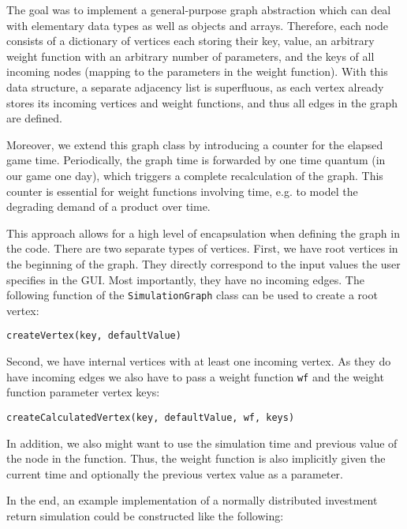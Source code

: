  
The goal was to implement a general-purpose graph abstraction which can deal with elementary data types as well as objects and arrays.
Therefore, each node consists of a dictionary of vertices each storing their key, value, an arbitrary weight function with an arbitrary number of parameters, and the keys of all incoming nodes (mapping to the parameters in the weight function). With this data structure, a separate adjacency list is superfluous, as each vertex already stores its incoming vertices and weight functions, and thus all edges in the graph are defined.


Moreover, we extend this graph class by introducing a counter for the elapsed game time. Periodically, the graph time is forwarded by one time quantum (in our game one day), which triggers a complete recalculation of the graph. This counter is essential for weight functions involving time, e.g. to model the degrading demand of a product over time.

This approach allows for a high level of encapsulation when defining the graph in the code. There are two separate types of vertices. First, we have root vertices in the beginning of the graph. They directly correspond to the input values the user specifies in the GUI. Most importantly, they have no incoming edges. The following function of the \texttt{SimulationGraph} class can be used to create a root vertex:

\begin{center}
	\texttt{createVertex(key, defaultValue)}
\end{center}

Second, we have internal vertices with at least one incoming vertex. As they do have incoming edges we also have to pass a weight function \texttt{wf} and the weight function parameter vertex keys:
\begin{center}
	\texttt{createCalculatedVertex(key, defaultValue, wf, keys)}
\end{center}
 
 In addition, we also might want to use the simulation time and previous value of the node in the function. Thus, the weight function is also implicitly given the current time and optionally the previous vertex value as a parameter.
 
 In the end, an example implementation of a normally distributed investment return simulation could be constructed like the following:\\
 
